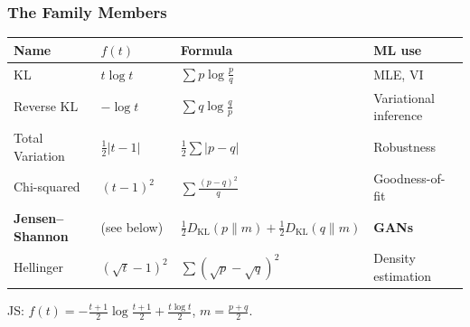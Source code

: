 \documentclass[aspectratio=169]{beamer}
\begin{document}
\begin{frame}
\frametitle{The Family Members}

\small
\vspace{-0.1cm}
\begin{center}
\footnotesize
\renewcommand{\arraystretch}{1.5}
\begin{tabular}{llll}
  \textbf{Name} & \textbf{$f(t)$} & \textbf{Formula} & \textbf{ML use} \\
  \hline
  KL & $t\log t$ & $\sum p\log\frac{p}{q}$ & MLE, VI \\
  Reverse KL & $-\log t$ & $\sum q\log\frac{q}{p}$ & Variational inference \\
  Total Variation & $\frac{1}{2}|t - 1|$ & $\frac{1}{2}\sum|p - q|$ & Robustness \\
  Chi-squared & $(t-1)^2$ & $\sum\frac{(p-q)^2}{q}$ & Goodness-of-fit \\
  \textbf{Jensen--Shannon} & (see below) & $\frac{1}{2}D_{\text{KL}}(p\|m) + \frac{1}{2}D_{\text{KL}}(q\|m)$ & \textbf{GANs} \\
  Hellinger & $(\sqrt{t} - 1)^2$ & $\sum(\sqrt{p} - \sqrt{q})^2$ & Density estimation \\
  \hline
\end{tabular}
\end{center}

\vspace{0.1cm}
\begin{center}
\small JS: $f(t) = -\frac{t+1}{2}\log\frac{t+1}{2} + \frac{t\log t}{2}$, \quad $m = \frac{p+q}{2}$.
\end{center}
\end{frame}
\end{document}

